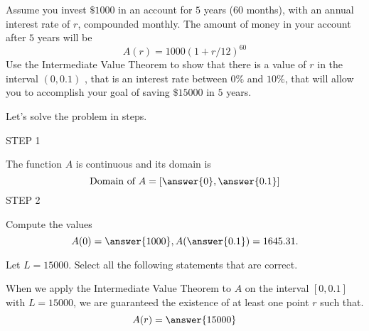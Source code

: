 \documentclass{ximera}
\author{Nela Lakos }
\begin{document}
\begin{exercise}
Assume you invest   $\$1000$ in an account for $5$ years ($60$ months), with an annual interest rate of $r$, compounded monthly.
The amount of money in your account after $5$ years will be
\[
A(r)=1000(1+r/12)^{60}
\]
Use the Intermediate Value Theorem to show that there is a value of $r$ in the interval $(0,0.1)$ , that is an interest rate between $0\%$ and $10\%$,
that will allow you to accomplish your goal of saving $\$15000$ in $5$ years.

Let's solve the problem in steps.

STEP 1

The function $A$ is continuous and its domain is
\[
\text{Domain of }A=[\answer{0},\answer{0.1}]
\] 
STEP 2

\begin{exercise}

Compute the values
\[
A(0)=\answer{1000},
A(\answer{0.1})=1645.31.
\]

\end{exercise}

\begin{exercise}
 Let $L=15000$. Select all the following statements that are correct.

\begin{selectAll}
\end{selectAll}

\end{exercise}
When we apply the Intermediate Value Theorem to $A$ on the interval $\left[0,0.1\right]$ with $L=15000$, we are guaranteed the existence of at least one point $r$ such that.
\[
A(r)=\answer{15000}
\]
\end{exercise}
\end{document}
